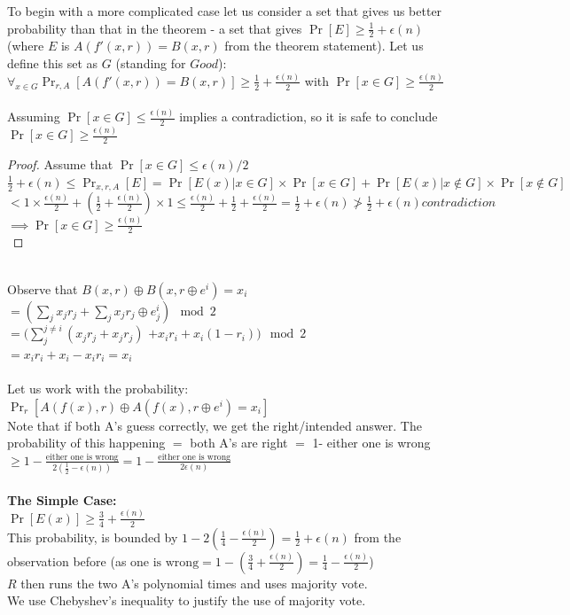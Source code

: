 \documentclass[12pt]{tufte-book}
\begin{document}
To begin with a more complicated case let us consider a set that gives us better probability than that in the theorem - a set that gives $\Pr[E] \ge \frac{1}{2} + \epsilon(n)$ (where $E$ is $A(f'(x,r)) = B(x,r)$ from the theorem statement).
Let us define this set as $G$ (standing for $Good$):\\
$\forall_{x \in G} \Pr_{r,A}[A(f'(x,r)) = B(x,r)] \ge \frac{1}{2} + \frac{\epsilon(n)}{2}$ with $\Pr[x \in G] \ge \frac{\epsilon(n)}{2}$ \\
\\
Assuming $\Pr[x \in G] \le \frac{\epsilon(n)}{2}$ implies a contradiction, so it is safe to conclude $\Pr[x \in G] \ge \frac{\epsilon(n)}{2}$\\
\begin{proof}
Assume that $\Pr[x \in G] \le \epsilon(n)/2$\\
$\frac{1}{2}+\epsilon(n) \le \Pr_{x,r,A}[E] = \Pr[E(x) | x \in G] \times \Pr[x \in G] + \Pr[E(x) | x \notin G] \times \Pr[x \notin G]$\\
$< 1 \times \frac{\epsilon(n)}{2} + (\frac{1}{2}+\frac{\epsilon(n)}{2}) \times 1 \le \frac{\epsilon(n)}{2} + \frac{1}{2}+\frac{\epsilon(n)}{2} = \frac{1}{2}+ \epsilon(n) \not> \frac{1}{2}+ \epsilon(n) contradiction$\\
$\implies \Pr[x \in G] \ge \frac{\epsilon(n)}{2}$\\
\end{proof}
\\
	Observe that $B(x,r) \oplus B(x, r\oplus e^i) = x_i$\\
	$= (\sum_j x_j r_j + \sum_j x_j r_j \oplus e^i_j) \mod 2$\\
	$= (\sum_j^{j \not= i} (x_j r_j + x_j r_j)$  $+ x_i r_i + x_i (1-r_i)) \mod 2$\\
	$= x_i r_i + x_i - x_i r_i = x_i$\\\\

Let us work with the probability: $\Pr_{r}[A(f(x), r) \oplus A(f(x), r \oplus e^i) = x_i]$\\
		Note that if both A's guess correctly, we get the right/intended answer.
		The probability of this happening $=$ both A's are right $=$ 1- either one is wrong $\ge  1-\frac{\text{either one is wrong}}{2 (\frac{1}{2}-\epsilon(n))} = 1 - \frac{\text{either one is wrong}}{2 \epsilon(n)}$\\\\
\textbf{The Simple Case:}\\
	$\Pr[E(x)] \ge \frac{3}{4}+\frac{\epsilon(n)}{2}$\\
	This probability, is bounded by $1-2(\frac{1}{4} - \frac{\epsilon(n)}{2}) = \frac{1}{2} + \epsilon(n)$ from the observation before (as $\text{one is wrong} = 1- (\frac{3}{4}+\frac{\epsilon(n)}{2}) = \frac{1}{4} - \frac{\epsilon(n)}{2}$)\\
	$R$ then runs the two A's polynomial times and uses majority vote.\\
	We use Chebyshev's inequality to justify the use of majority vote.
\end{document}
